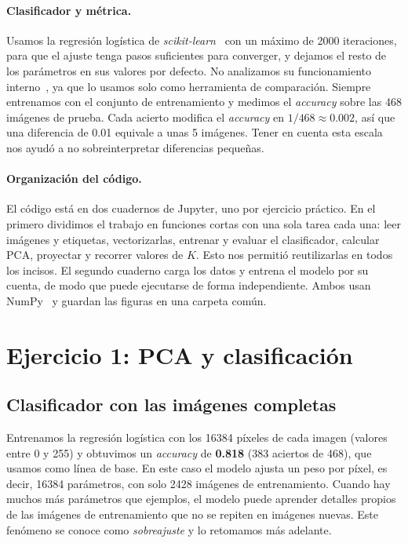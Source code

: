 \documentclass[11pt,a4paper]{article}
\newcommand{\acc}{\emph{accuracy}}
\begin{document}
\paragraph{Clasificador y métrica.} Usamos la regresión logística de \emph{scikit-learn}~\cite{sklearn} con
un máximo de 2000 iteraciones, para que el ajuste tenga pasos suficientes para converger, y dejamos el resto
de los parámetros en sus valores por defecto. No analizamos su funcionamiento interno~\cite{mahmood}, ya que
lo usamos solo como herramienta de comparación. Siempre entrenamos con el conjunto de entrenamiento y
medimos el \acc{} sobre las 468 imágenes de prueba. Cada acierto modifica el \acc{} en $1/468\approx0.002$,
así que una diferencia de 0.01 equivale a unas 5 imágenes. Tener en cuenta esta escala nos ayudó a no
sobreinterpretar diferencias pequeñas.

\paragraph{Organización del código.} El código está en dos cuadernos de Jupyter, uno por ejercicio
práctico. En el primero dividimos el trabajo en funciones cortas con una sola tarea cada una: leer imágenes
y etiquetas, vectorizarlas, entrenar y evaluar el clasificador, calcular PCA, proyectar y recorrer valores
de $K$. Esto nos permitió reutilizarlas en todos los incisos. El segundo cuaderno carga los datos y entrena
el modelo por su cuenta, de modo que puede ejecutarse de forma independiente. Ambos usan NumPy~\cite{numpy}
y guardan las figuras en una carpeta común.

\section{Ejercicio 1: PCA y clasificación}
\subsection{Clasificador con las imágenes completas}

Entrenamos la regresión logística con los 16384 píxeles de cada imagen (valores entre 0 y 255) y obtuvimos
un \acc{} de \textbf{0.818} (383 aciertos de 468), que usamos como línea de base. En este caso el modelo
ajusta un peso por píxel, es decir, 16384 parámetros, con solo 2428 imágenes de entrenamiento. Cuando hay
muchos más parámetros que ejemplos, el modelo puede aprender detalles propios de las imágenes de
entrenamiento que no se repiten en imágenes nuevas. Este fenómeno se conoce como \emph{sobreajuste} y lo
retomamos más adelante.
\end{document}
